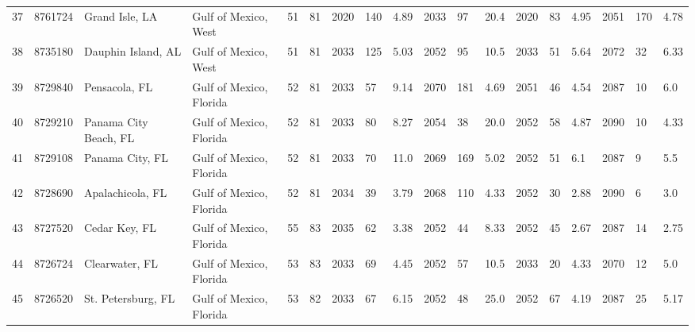 \begin{longtable}{llllllllllllllllll}
37 &          8761724 &              Grand Isle, LA &     Gulf of Mexico, West &              51 &       81 &                      2020 &  140 &   4.89 &     2033 &   97 &   20.4 &                          2020 &  83 &  4.95 &     2051 &  170 &  4.78 \\
38 &          8735180 &          Dauphin Island, AL &     Gulf of Mexico, West &              51 &       81 &                      2033 &  125 &   5.03 &     2052 &   95 &   10.5 &                          2033 &  51 &  5.64 &     2072 &   32 &  6.33 \\
39 &          8729840 &               Pensacola, FL &  Gulf of Mexico, Florida &              52 &       81 &                      2033 &   57 &   9.14 &     2070 &  181 &   4.69 &                          2051 &  46 &  4.54 &     2087 &   10 &   6.0 \\
40 &          8729210 &       Panama City Beach, FL &  Gulf of Mexico, Florida &              52 &       81 &                      2033 &   80 &   8.27 &     2054 &   38 &   20.0 &                          2052 &  58 &  4.87 &     2090 &   10 &  4.33 \\
41 &          8729108 &             Panama City, FL &  Gulf of Mexico, Florida &              52 &       81 &                      2033 &   70 &   11.0 &     2069 &  169 &   5.02 &                          2052 &  51 &   6.1 &     2087 &    9 &   5.5 \\
42 &          8728690 &            Apalachicola, FL &  Gulf of Mexico, Florida &              52 &       81 &                      2034 &   39 &   3.79 &     2068 &  110 &   4.33 &                          2052 &  30 &  2.88 &     2090 &    6 &   3.0 \\
43 &          8727520 &               Cedar Key, FL &  Gulf of Mexico, Florida &              55 &       83 &                      2035 &   62 &   3.38 &     2052 &   44 &   8.33 &                          2052 &  45 &  2.67 &     2087 &   14 &  2.75 \\
44 &          8726724 &              Clearwater, FL &  Gulf of Mexico, Florida &              53 &       83 &                      2033 &   69 &   4.45 &     2052 &   57 &   10.5 &                          2033 &  20 &  4.33 &     2070 &   12 &   5.0 \\
45 &          8726520 &          St. Petersburg, FL &  Gulf of Mexico, Florida &              53 &       82 &                      2033 &   67 &   6.15 &     2052 &   48 &   25.0 &                          2052 &  67 &  4.19 &     2087 &   25 &  5.17 \\

\end{longtable}
